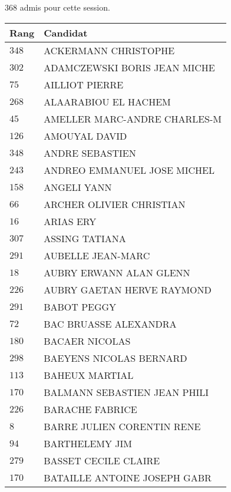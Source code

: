 




  $368$ admis pour cette session.

  \begin{xltabular}{\linewidth}{|l|X|}
    \hline
    \textbf{Rang} & \textbf{Candidat} \\
    \hline
    $348$ & ACKERMANN CHRISTOPHE \\
    \hline
    $302$ & ADAMCZEWSKI BORIS JEAN MICHE \\
    \hline
    $75$ & AILLIOT PIERRE \\
    \hline
    $268$ & ALAARABIOU EL HACHEM \\
    \hline
    $45$ & AMELLER MARC-ANDRE CHARLES-M \\
    \hline
    $126$ & AMOUYAL DAVID \\
    \hline
    $348$ & ANDRE SEBASTIEN \\
    \hline
    $243$ & ANDREO EMMANUEL JOSE MICHEL \\
    \hline
    $158$ & ANGELI YANN \\
    \hline
    $66$ & ARCHER OLIVIER CHRISTIAN \\
    \hline
    $16$ & ARIAS ERY \\
    \hline
    $307$ & ASSING TATIANA \\
    \hline
    $291$ & AUBELLE JEAN-MARC \\
    \hline
    $18$ & AUBRY ERWANN ALAN GLENN \\
    \hline
    $226$ & AUBRY GAETAN HERVE RAYMOND \\
    \hline
    $291$ & BABOT PEGGY \\
    \hline
    $72$ & BAC BRUASSE ALEXANDRA \\
    \hline
    $180$ & BACAER NICOLAS \\
    \hline
    $298$ & BAEYENS NICOLAS BERNARD \\
    \hline
    $113$ & BAHEUX MARTIAL \\
    \hline
    $170$ & BALMANN SEBASTIEN JEAN PHILI \\
    \hline
    $226$ & BARACHE FABRICE \\
    \hline
    $8$ & BARRE JULIEN CORENTIN RENE \\
    \hline
    $94$ & BARTHELEMY JIM \\
    \hline
    $279$ & BASSET CECILE CLAIRE \\
    \hline
    $170$ & BATAILLE ANTOINE JOSEPH GABR \\

\end{xltabular}
